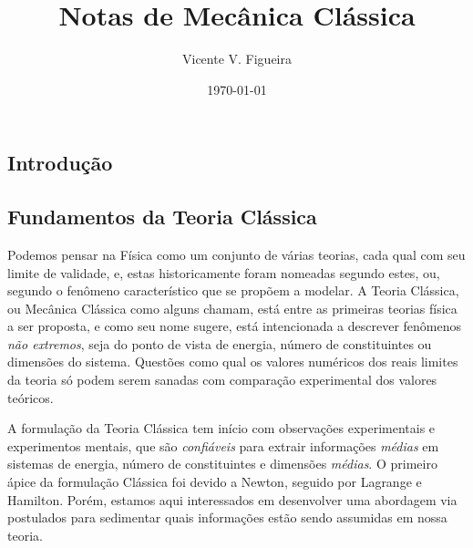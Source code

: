 \documentclass[twoside]{amsart}
\title{
Notas de Mecânica Clássica
}
\author{
  Vicente V. Figueira
       }
\date{\today}
\numberwithin{equation}{section}
\begin{document}
\maketitle

\tableofcontents


\begin{refsection}
\section{Introdução}

\subsection{Fundamentos da Teoria Clássica}

Podemos pensar na Física como um conjunto de várias teorias, cada qual com seu limite de 
validade, e, estas historicamente foram nomeadas segundo estes, ou, segundo o fenômeno 
característico que se propõem a modelar. A Teoria Clássica, ou Mecânica Clássica como 
alguns chamam, está entre as primeiras teorias física a ser proposta, e como seu nome 
sugere, está intencionada a descrever fenômenos \emph{não extremos}, seja do ponto de 
vista de energia, número de constituintes ou dimensões do sistema. Questões como qual 
os valores numéricos dos reais limites da teoria só podem serem sanadas com comparação 
experimental dos valores teóricos.

A formulação da Teoria Clássica tem início com observações experimentais e experimentos 
mentais, que são \emph{confiáveis} para extrair informações \emph{médias} em sistemas de 
energia, número de constituintes e dimensões \emph{médias}. O primeiro ápice da formulação 
Clássica foi devido a Newton, seguido por Lagrange e Hamilton. Porém, estamos aqui interessados 
em desenvolver uma abordagem via postulados para sedimentar quais informações estão sendo 
assumidas em nossa teoria.


\end{refsection}
\end{document}
